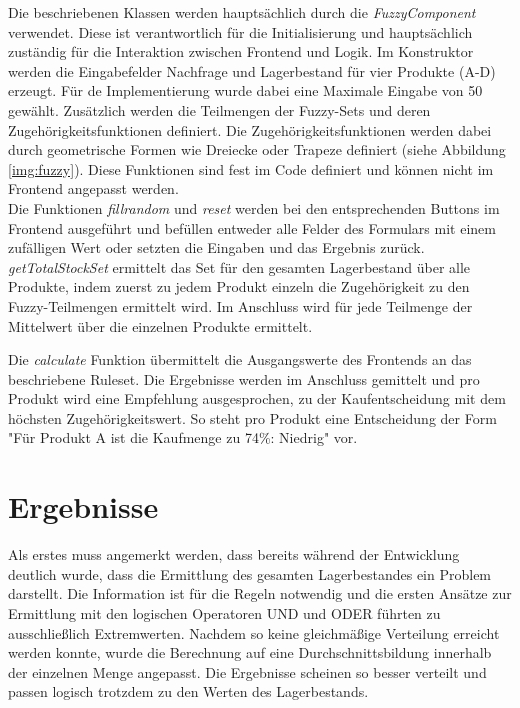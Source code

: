 \documentclass[]{scrartcl}
\begin{document}
Die beschriebenen Klassen werden hauptsächlich durch die \textit{FuzzyComponent} verwendet. Diese ist verantwortlich für die Initialisierung und hauptsächlich zuständig für die Interaktion zwischen Frontend und Logik. Im Konstruktor werden die Eingabefelder Nachfrage und Lagerbestand für vier Produkte (A-D) erzeugt. Für de Implementierung wurde dabei eine Maximale Eingabe von 50 gewählt. Zusätzlich werden die Teilmengen der Fuzzy-Sets und deren Zugehörigkeitsfunktionen definiert. Die Zugehörigkeitsfunktionen werden dabei durch geometrische Formen wie Dreiecke oder Trapeze definiert (siehe Abbildung \ref{img:fuzzy}). Diese Funktionen sind fest im Code definiert und können nicht im Frontend angepasst werden.
\\

Die Funktionen \textit{fillrandom} und \textit{reset} werden bei den entsprechenden Buttons im Frontend ausgeführt und befüllen entweder alle Felder des Formulars mit einem zufälligen Wert oder setzten die Eingaben und das Ergebnis zurück. \textit{getTotalStockSet} ermittelt das Set für den gesamten Lagerbestand über alle Produkte, indem zuerst zu jedem Produkt einzeln die Zugehörigkeit zu den Fuzzy-Teilmengen ermittelt wird. Im Anschluss
wird für jede Teilmenge der Mittelwert über die einzelnen Produkte ermittelt.

Die \textit{calculate} Funktion übermittelt die Ausgangswerte des Frontends an das beschriebene Ruleset. Die Ergebnisse werden im Anschluss gemittelt und pro Produkt wird eine Empfehlung ausgesprochen, zu der Kaufentscheidung mit dem höchsten Zugehörigkeitswert. So steht pro Produkt eine Entscheidung der Form "Für Produkt A ist die Kaufmenge zu 74\%: Niedrig" vor.

\section{Ergebnisse}
\label{ergebnisse}
Als erstes muss angemerkt werden, dass bereits während der Entwicklung deutlich wurde, dass die Ermittlung des gesamten Lagerbestandes ein Problem darstellt. Die Information ist für die Regeln notwendig und die ersten Ansätze zur Ermittlung mit den logischen Operatoren UND und ODER führten zu ausschließlich Extremwerten. Nachdem so keine gleichmäßige Verteilung erreicht werden konnte, wurde die Berechnung auf eine Durchschnittsbildung innerhalb der einzelnen Menge angepasst. Die Ergebnisse  scheinen so besser verteilt und passen logisch trotzdem zu den Werten des Lagerbestands.
\\
\end{document}
